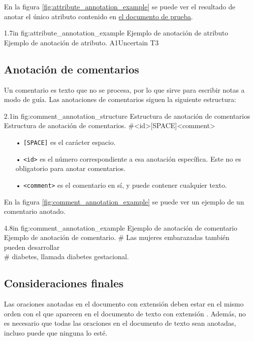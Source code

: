 En la figura \ref{fig:attribute_annotation_example} se puede ver el resultado de anotar el único atributo contenido en \hyperref[sentence:annotation_example]{el documento de prueba}.

\begin{annexample}
	[backgroundcolor=cyan!13]
	{1.7in}
	{fig:attribute_annotation_example}
	{Ejemplo de anotación de atributo}
	{Ejemplo de anotación de atributo.}
	A1\space\space Uncertain T3
\end{annexample}

\subsection{Anotación de comentarios}
Un comentario es texto que no se procesa, por lo que sirve para escribir notas a modo de guía. Las anotaciones de comentarios siguen la siguiente estructura:

\begin{annexample}
	[backgroundcolor=green!13]
	{2.1in}
	{fig:comment_annotation_structure}
	{Estructura de anotación de comentarios}
	{Estructura de anotación de comentarios.}
	\#<id>[SPACE]<comment>
\end{annexample}

\vspace{-0.2in}
\begin{itemize}
	\item[•] \texttt{[SPACE]} es el carácter espacio.
	\item[•] \texttt{<id>} es el número correspondiente a esa anotación específica. Este no es obligatorio para anotar comentarios.
	\item[•] \texttt{<comment>} es el comentario en sí, y puede contener cualquier texto.
\end{itemize}

En la figura \ref{fig:comment_annotation_example} se puede ver un ejemplo de un comentario anotado.

\begin{annexample}
	[backgroundcolor=cyan!13]
	{4.8in}
	{fig:comment_annotation_example}
	{Ejemplo de anotación de comentario}
	{Ejemplo de anotación de comentario.}
	\# Las mujeres embarazadas también pueden desarrollar\\
	\# diabetes, llamada diabetes gestacional.
\end{annexample}

\subsection{Consideraciones finales}\label{section:annotation_conventions}
Las oraciones anotadas en el documento con extensión  deben estar en el mismo orden con el que aparecen en el documento de texto con extensión . Además, no es necesario que todas las oraciones en el documento de texto sean anotadas, incluso puede que ninguna lo esté.

